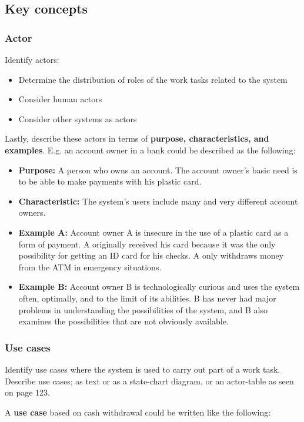 \subsection{Key concepts}
\subsubsection{Actor}
Identify actors:
\begin{itemize}
    \item Determine the distribution of roles of the work tasks related to the system
    \item Consider human actors
    \item Consider other systems as actors
\end{itemize}

\noindent Lastly, describe these actors in terms of \textbf{purpose, characteristics, and examples}. E.g. an account owner in a bank could be described as the following:

\begin{itemize}
    \item[] \textbf{Purpose:} A person who owns an account. The account owner's basic need is to be able to make payments with his plastic card.
    \item[] \textbf{Characteristic:} The system's users include many and very different account owners.
    \item[] \textbf{Example A:} Account owner A is insecure in the use of a plastic card as a form of payment. A originally received his card because it was the only possibility for getting an ID card for his checks. A only withdraws money from the ATM in emergency situations.
    \item[] \textbf{Example B:} Account owner B is technologically curious and uses the system often, optimally, and to the limit of its abilities. B has never had major problems in understanding the possibilities of the system, and B also examines the possibilities that are not obviously available.
\end{itemize}


\subsubsection{Use cases}
Identify use cases where the system is used to carry out part of a work task. Describe use cases; as text or as a state-chart diagram, or an actor-table as seen on page 123.


\noindent A \textbf{use case} based on cash withdrawal could be written like the following:

